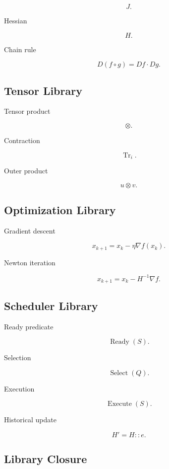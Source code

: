 \documentclass[12pt,oneside]{article}
\theoremstyle{definition}
\theoremstyle{remark}
\begin{document}
\[
J.
\]

Hessian

\[
H.
\]

Chain rule

\[
D(f\circ g)
=
Df
\cdot
Dg.
\]

\subsection*{Tensor Library}

Tensor product

\[
\otimes.
\]

Contraction

\[
\operatorname{Tr}_i.
\]

Outer product

\[
u
\otimes
v.
\]

\subsection*{Optimization Library}

Gradient descent

\[
x_{k+1}
=
x_k
-
\eta
\nabla f(x_k).
\]

Newton iteration

\[
x_{k+1}
=
x_k
-
H^{-1}
\nabla f.
\]

\subsection*{Scheduler Library}

Ready predicate

\[
\operatorname{Ready}(S).
\]

Selection

\[
\operatorname{Select}(Q).
\]

Execution

\[
\operatorname{Execute}(S).
\]

Historical update

\[
H'
=
H::e.
\]

\subsection*{Library Closure}
\end{document}
